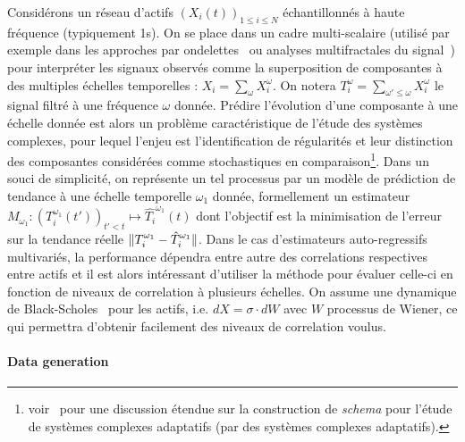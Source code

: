 {Considérons un réseau d'actifs $(X_i(t))_{1\leq i \leq N}$ échantillonnés à haute fréquence (typiquement 1s). On se place dans un cadre multi-scalaire (utilisé par exemple dans les approches par ondelettes~\cite{ramsey2002wavelets} ou analyses multifractales du signal~\cite{bouchaud2000apparent}) pour interpréter les signaux observés comme la superposition de composantes à des multiples échelles temporelles : $X_i=\sum_{\omega}{X_i^{\omega}}$. On notera $T_i^{\omega} = \sum_{\omega' \leq \omega} X_i^{\omega}$ le signal filtré à une fréquence $\omega$ donnée. Prédire l'évolution d'une composante à une échelle donnée est alors un problème caractéristique de l'étude des systèmes complexes, pour lequel l'enjeu est l'identification de régularités et leur distinction des composantes considérées comme stochastiques en comparaison\footnote{voir~\cite{gell1995quark} pour une discussion étendue sur la construction de \emph{schema} pour l'étude de systèmes complexes adaptatifs (par des systèmes complexes adaptatifs).}. Dans un souci de simplicité, on représente un tel processus par un modèle de prédiction de tendance à une échelle temporelle $\omega_1$ donnée, formellement un estimateur $M_{\omega_1} : (T_i^{\omega_1}(t'))_{t'<t} \mapsto \hat{T_i}^{\omega_1}(t)$ dont l'objectif est la minimisation de l'erreur sur la tendance réelle $\| T_i^{\omega_1} - \hat{T}_i^{\omega_1} \|$. Dans le cas d'estimateurs auto-regressifs multivariés, la performance dépendra entre autre des correlations respectives entre actifs et il est alors intéressant d'utiliser la méthode pour évaluer celle-ci en fonction de niveaux de correlation à plusieurs échelles. On assume une dynamique de Black-Scholes~\cite{jarrow1999honor} pour les actifs, i.e. $dX = \sigma\cdot dW$ avec $W$ processus de Wiener, ce qui permettra d'obtenir facilement des niveaux de correlation voulus.
}


\paragraph{Data generation}


